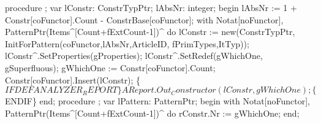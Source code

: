 \nwenddocs{}\endmoddef\nwstartdeflinemarkup{}\nwenddeflinemarkup
procedure ;
var
   lConstr: ConstrTypPtr;
   lAbsNr: integer;
begin
   lAbsNr :=  1 + Constr[coFunctor].Count - ConstrBase[coFunctor];
   with Notat[noFunctor], PatternPtr(Items^[Count+fExtCount-1])^ do
   lConstr  :=  new(ConstrTypPtr,
                    InitForPattern(coFunctor,lAbsNr,ArticleID,
                                   fPrimTypes,ItTyp));
   lConstr^.SetProperties(gProperties);
   lConstr^.SetRedef(gWhichOne, gSuperfluous);
   gWhichOne :=  Constr[coFunctor].Count;
   Constr[coFunctor].Insert(lConstr);
   \{$IFDEF ANALYZER_REPORT\}
   AReport.Out_Constructor(lConstr, gWhichOne);
   \{$ENDIF\}
end;
\eatline
{}\nwendcode{}\nwdocspar
\nwenddocs{}\endmoddef\nwstartdeflinemarkup{}\nwenddeflinemarkup
procedure ;
var
   lPattern: PatternPtr;
begin
   with Notat[noFunctor], PatternPtr(Items^[Count+fExtCount-1])^ do
                             rConstr.Nr := gWhichOne;
end;
\eatline
